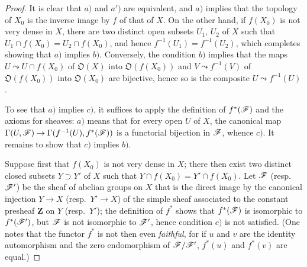 \begin{proof}
It is clear that $a)$ and $a')$ are equivalent, and $a)$ implies that the topology of $X_0$ is the inverse image by $f$ of that of $X$.
On the other hand, if $f(X_0)$ is not very dense in $X$, there are two distinct open subsets $U_1$, $U_2$ of $X$ such that $U_1\cap f(X_0)=U_2\cap f(X_0)$, and hence $f^{-1}(U_1)=f^{-1}(U_2)$, which completes showing that $a)$ implies $b)$.
Conversely, the condition $b)$ implies that the maps $U\leadsto U\cap f(X_0)$ of $\mathfrak{O}(X)$ into $\mathfrak{O}(f(X_0))$ and $V\leadsto f^{-1}(V)$ of $\mathfrak{O}(f(X_0))$ into $\mathfrak{O}(X_0)$ are bijective, hence so is the composite $U\leadsto f^{-1}(U)$.

To see that $a)$ implies $c)$, it suffices to apply the definition of $f^*(\mathscr{F})$  and the axioms for sheaves: $a)$ means that for every open $U$ of $X$, the canonical map $\Gamma(U,\mathscr{F})\to\Gamma(f^{-1}(U),f^*(\mathscr{F}))$ is a functorial bijection in $\mathscr{F}$, whence $c)$.
It remains to show that $c)$ implies $b)$.

Suppose first that $f(X_0)$ is not very dense in $X$; there then exist two distinct closed subsets $Y\supset Y'$ of $X$ such that $Y\cap f(X_0)=Y'\cap f(X_0)$.
Let $\mathscr{F}$ (resp.\ $\mathscr{F}'$) be the sheaf of abelian groups on $X$ that is the direct image by the canonical injection $Y\to X$ (resp.\ $Y'\to X$) of the simple sheaf associated to the constant presheaf $\mathbf{Z}$ on $Y$ (resp.\ $Y'$); the definition of $f^*$  shows that $f^*(\mathscr{F})$ is isomorphic to $f^*(\mathscr{F}')$, but $\mathscr{F}$ is not isomorphic to $\mathscr{F}'$, hence condition $c)$ is not satisfied.
(One notes that the functor $f^*$ is not then even \emph{faithful}, for if $u$ and $v$ are the identity automorphism and the zero endomorphism of $\mathscr{F}/\mathscr{F}'$, $f^*(u)$ and $f^*(v)$ are equal.)


\end{proof}
